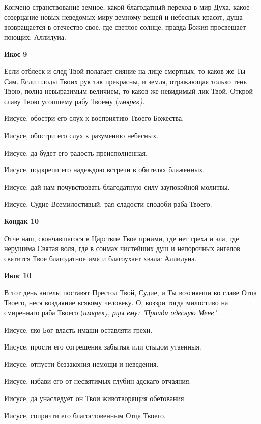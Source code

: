 Кончено странствование земное, какой благодатный переход в мир Духа, какое созерцание новых неведомых миру земному вещей и небесных красот, душа возвращается в отечество свое, где светлое солнце, правда Божия просвещает поющих: Аллилуиа.


\medskip


\bfseries Икос 9\normalfont{}


Если отблеск и след Твой полагает сияние на лице смертных, то каков же Ты Сам. Если плоды Твоих рук так прекрасны, и земля, отражающая только тень Твою, полна невыразимым величием, то каков же невидимый лик Твой. Открой славу Твою усопшему рабу Твоему (\itshape имярек\normalfont{}). 

Иисусе, обостри его слух к восприятию Твоего Божества. 

Иисусе, обостри его слух к разумению небесных. 

Иисусе, да будет его радость преисполненная. 

Иисусе, подкрепи его надеждою встречи в обителях блаженных. 

Иисусе, дай нам почувствовать благодатную силу заупокойной молитвы. 

Иисусе, Судие Всемилостивый, рая сладости сподоби раба Твоего.


\medskip


\bfseries Кондак 10\normalfont{}


Отче наш, скончавшагося в Царствие Твое приими, где нет греха и зла, где нерушима Святая воля, где в сонмах чистейших душ и непорочных ангелов святится Твое благодатное имя и благоухает хвала: Аллилуиа.


\medskip


\bfseries Икос 10\normalfont{}


В тот день ангелы поставят Престол Твой, Судие, и Ты возсияеши во славе Отца Твоего, неся воздаяние всякому человеку. О, воззри тогда милостиво на смиреннаго раба Твоего (\itshape имярек\normalfont{}), рцы ему: "Прииди одесную Мене". 

Иисусе, яко Бог власть имаши оставляти грехи. 

Иисусе, прости его согрешения забытыя или стыдом утаенныя. 

Иисусе, отпусти беззакония немощи и неведения. 

Иисусе, избави его от несвятимых глубин адскаго отчаяния. 

Иисусе, да унаследует он Твои животворящия обетования. 

Иисусе, сопричти его благословенным Отца Твоего. 

